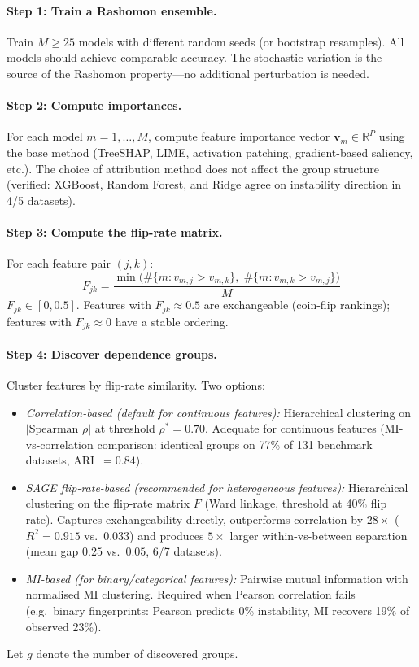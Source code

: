 \documentclass[11pt]{article}
\begin{document}
\paragraph{Step 1: Train a Rashomon ensemble.}
Train $M \geq 25$ models with different random seeds (or bootstrap resamples).  All models should achieve comparable accuracy.  The stochastic variation is the source of the Rashomon property---no additional perturbation is needed.

\paragraph{Step 2: Compute importances.}
For each model $m = 1, \ldots, M$, compute feature importance vector $\mathbf{v}_m \in \mathbb{R}^P$ using the base method (TreeSHAP, LIME, activation patching, gradient-based saliency, etc.).  The choice of attribution method does not affect the group structure (verified: XGBoost, Random Forest, and Ridge agree on instability direction in 4/5 datasets).

\paragraph{Step 3: Compute the flip-rate matrix.}
For each feature pair $(j, k)$:
\[
  F_{jk} = \frac{\min\bigl(\#\{m : v_{m,j} > v_{m,k}\},\; \#\{m : v_{m,k} > v_{m,j}\}\bigr)}{M}
\]
$F_{jk} \in [0, 0.5]$.  Features with $F_{jk} \approx 0.5$ are exchangeable (coin-flip rankings); features with $F_{jk} \approx 0$ have a stable ordering.

\paragraph{Step 4: Discover dependence groups.}
Cluster features by flip-rate similarity.  Two options:
\begin{itemize}
  \item \emph{Correlation-based (default for continuous features):} Hierarchical clustering on $|\text{Spearman } \rho|$ at threshold $\rho^* = 0.70$.  Adequate for continuous features (MI-vs-correlation comparison: identical groups on 77\% of 131 benchmark datasets, ARI~$= 0.84$).
  \item \emph{SAGE flip-rate-based (recommended for heterogeneous features):} Hierarchical clustering on the flip-rate matrix $F$ (Ward linkage, threshold at 40\% flip rate).  Captures exchangeability directly, outperforms correlation by $28\times$ ($R^2 = 0.915$ vs.\ $0.033$) and produces $5\times$ larger within-vs-between separation (mean gap $0.25$ vs.\ $0.05$, 6/7 datasets).
  \item \emph{MI-based (for binary/categorical features):} Pairwise mutual information with normalised MI clustering.  Required when Pearson correlation fails (e.g.\ binary fingerprints: Pearson predicts 0\% instability, MI recovers 19\% of observed 23\%).
\end{itemize}
Let $g$ denote the number of discovered groups.
\end{document}
